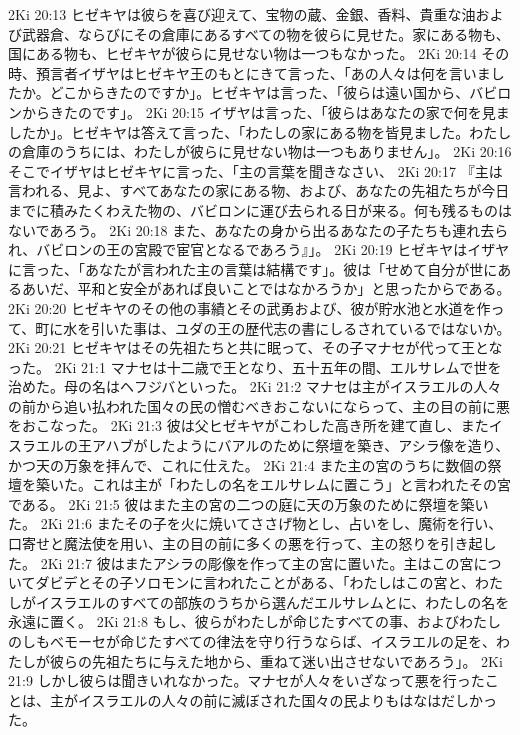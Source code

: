 2Ki 20:13  ヒゼキヤは彼らを喜び迎えて、宝物の蔵、金銀、香料、貴重な油および武器倉、ならびにその倉庫にあるすべての物を彼らに見せた。家にある物も、国にある物も、ヒゼキヤが彼らに見せない物は一つもなかった。
2Ki 20:14  その時、預言者イザヤはヒゼキヤ王のもとにきて言った、「あの人々は何を言いましたか。どこからきたのですか」。ヒゼキヤは言った、「彼らは遠い国から、バビロンからきたのです」。
2Ki 20:15  イザヤは言った、「彼らはあなたの家で何を見ましたか」。ヒゼキヤは答えて言った、「わたしの家にある物を皆見ました。わたしの倉庫のうちには、わたしが彼らに見せない物は一つもありません」。
2Ki 20:16  そこでイザヤはヒゼキヤに言った、「主の言葉を聞きなさい、
2Ki 20:17  『主は言われる、見よ、すべてあなたの家にある物、および、あなたの先祖たちが今日までに積みたくわえた物の、バビロンに運び去られる日が来る。何も残るものはないであろう。
2Ki 20:18  また、あなたの身から出るあなたの子たちも連れ去られ、バビロンの王の宮殿で宦官となるであろう』」。
2Ki 20:19  ヒゼキヤはイザヤに言った、「あなたが言われた主の言葉は結構です」。彼は「せめて自分が世にあるあいだ、平和と安全があれば良いことではなかろうか」と思ったからである。
2Ki 20:20  ヒゼキヤのその他の事績とその武勇および、彼が貯水池と水道を作って、町に水を引いた事は、ユダの王の歴代志の書にしるされているではないか。
2Ki 20:21  ヒゼキヤはその先祖たちと共に眠って、その子マナセが代って王となった。
2Ki 21:1  マナセは十二歳で王となり、五十五年の間、エルサレムで世を治めた。母の名はヘフジバといった。
2Ki 21:2  マナセは主がイスラエルの人々の前から追い払われた国々の民の憎むべきおこないにならって、主の目の前に悪をおこなった。
2Ki 21:3  彼は父ヒゼキヤがこわした高き所を建て直し、またイスラエルの王アハブがしたようにバアルのために祭壇を築き、アシラ像を造り、かつ天の万象を拝んで、これに仕えた。
2Ki 21:4  また主の宮のうちに数個の祭壇を築いた。これは主が「わたしの名をエルサレムに置こう」と言われたその宮である。
2Ki 21:5  彼はまた主の宮の二つの庭に天の万象のために祭壇を築いた。
2Ki 21:6  またその子を火に焼いてささげ物とし、占いをし、魔術を行い、口寄せと魔法使を用い、主の目の前に多くの悪を行って、主の怒りを引き起した。
2Ki 21:7  彼はまたアシラの彫像を作って主の宮に置いた。主はこの宮についてダビデとその子ソロモンに言われたことがある、「わたしはこの宮と、わたしがイスラエルのすべての部族のうちから選んだエルサレムとに、わたしの名を永遠に置く。
2Ki 21:8  もし、彼らがわたしが命じたすべての事、およびわたしのしもべモーセが命じたすべての律法を守り行うならば、イスラエルの足を、わたしが彼らの先祖たちに与えた地から、重ねて迷い出させないであろう」。
2Ki 21:9  しかし彼らは聞きいれなかった。マナセが人々をいざなって悪を行ったことは、主がイスラエルの人々の前に滅ぼされた国々の民よりもはなはだしかった。
